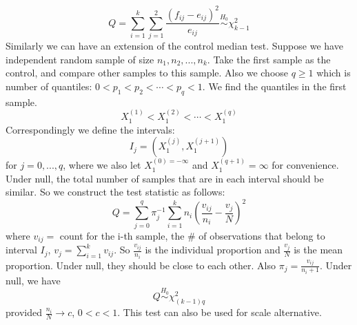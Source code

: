 \documentclass[twoside]{article}
\begin{document}
	$$
	Q = \sum_{i=1}^{k} \sum_{j=1}^2 \frac{\left( f_{ij} - e_{ij} \right)^2}{e_{ij}} \stackrel{H_0}{\sim} \chi_{k-1}^{2}
	$$
	Similarly we can have an extension of the control median test. Suppose we have independent random sample of size $n_1, n_2, ..., n_k$. Take the first sample as the control, and compare other samples to this sample. Also we choose $q \geqslant 1$ which is number of quantiles: $0 < p_1 < p_2 < \cdots < p_q <1$. We find the quantiles in the first sample. 
	$$
	X_1^{(1)} < X_1^{(2)} < \cdots < X_1^{(q)}
	$$
	Correspondingly we define the intervals:
	$$
	I_j = \left( X_1^{(j)}, X_1^{(j+1)} \right)
	$$
	for $j = 0, ..., q$, where we also let $X_1^{(0) = - \infty}$ and $X_1^{(q+1)} = \infty$ for convenience. Under null, the total number of samples that are in each interval should be similar. So we construct the test statistic as follows:
	$$
	Q = \sum_{j=0}^{q} \pi_j^{-1} \sum_{i=1}^{k} n_i \left( \frac{v_{ij}}{n_i} - \frac{v_j}{N} \right)^2
	$$
	where $v_{ij} =$ count for the i-th sample, the \# of observations that belong to interval $I_j$, $v_j = \sum_{i=1}^{k} v_{ij}$. So $\frac{v_{ij}}{n_i}$ is the individual proportion and $\frac{v_j}{N}$ is the mean proportion. Under null, they should be close to each other. Also $\pi_j = \frac{v_{ij}}{n_i + 1}$. Under null, we have
	$$
	Q \stackrel{H_0}{\sim} \chi^2_{(k-1)q}
	$$
	provided $\frac{n_i}{N} \rightarrow c$, $0<c<1$. This test can also be used for scale alternative. 
	
\end{document}
